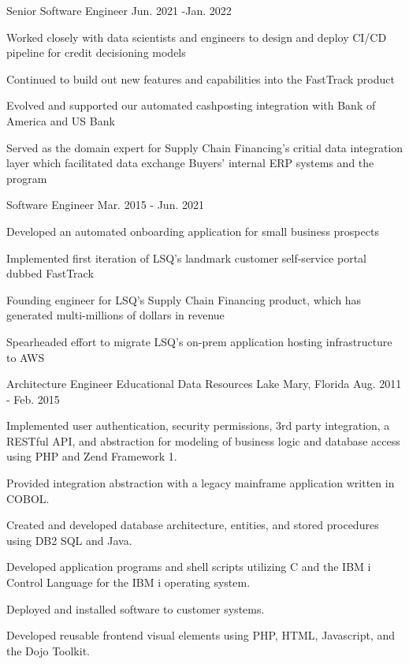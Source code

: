 \begin{cventries}
   \cventry
   {Senior Software Engineer} %
   {} %
   {} %
   {Jun. 2021 -Jan. 2022} %
   {
      \begin{cvitems} %
        \item{Worked closely with data scientists and engineers to design and deploy CI/CD pipeline for credit decisioning models}
        \item{Continued to build out new features and capabilities into the FastTrack product}
        \item{Evolved and supported our automated cashposting integration with Bank of America and US Bank}
        \item{Served as the domain expert for Supply Chain Financing's critial data integration layer which facilitated data exchange Buyers' internal ERP systems and the program}
      \end{cvitems}
   }
   
   \cventry
   {Software Engineer} %
   {} %
   {} %
   {Mar. 2015 - Jun. 2021} %
   {
      \begin{cvitems} %
        \item{Developed an automated onboarding application for small business prospects}
        \item{Implemented first iteration of LSQ's landmark customer self-service portal dubbed FastTrack}
        \item{Founding engineer for LSQ's Supply Chain Financing product, which has generated multi-millions of dollars in revenue}
        \item{Spearheaded effort to migrate LSQ's on-prem application hosting infrastructure to AWS}
      \end{cvitems}
   }

  \cventry
    {Architecture Engineer} %
    {Educational Data Resources} %
    {Lake Mary, Florida} %
    {Aug. 2011 - Feb. 2015} %
    {
      \begin{cvitems} %
        \item{Implemented user authentication, security permissions, 3rd party integration, a RESTful API, and abstraction for modeling of business logic and database access using PHP and Zend Framework 1.}
        \item{Provided integration abstraction with a legacy mainframe application written in COBOL.}
        \item{Created and developed database architecture, entities, and stored procedures using DB2 SQL and Java.}
        \item{Developed application programs and shell scripts utilizing C and the IBM i Control Language for the IBM i operating system.}
        \item{Deployed and installed software to customer systems.}
        \item{Developed reusable frontend visual elements using PHP, HTML, Javascript, and the Dojo Toolkit.}
      \end{cvitems}
    }


\end{cventries}
